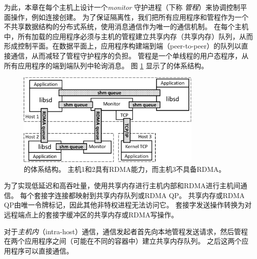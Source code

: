为此，本章在每个主机上设计一个\emph {monitor} 守护进程（下称 \textit{管程}）来协调控制平面操作，例如连接创建。
为了保证隔离性，我们把所有应用程序和管程作为一个不共享数据结构的分布式系统，使用消息通信作为唯一的通信机制。
在每个主机中，所有加载\libipc {}的应用程序必须与主机的管程建立共享内存（共享内存）队列，从而形成控制平面。在数据平面上，应用程序构建端到端（peer-to-peer）的队列以直接通信，从而减轻了管程守护程序的负担。
管程是一个单线程的用户态程序，从所有应用程序的端到端队列中轮询消息。
图 \ref {socksdirect:fig:architecture} 显示了\sys {}的体系结构。


\begin{figure}[htbp]
	\centering
	\includegraphics[width=0.8\textwidth]{images/architecture_new}
	\caption{\sys {}的体系结构。 主机1和2具有RDMA能力，而主机3不具备RDMA。}
	\label{socksdirect:fig:architecture}
\end{figure}



为了实现低延迟和高吞吐量，\sys {}使用共享内存进行主机内部和RDMA进行主机间通信。
每个套接字连接都映射到共享内存队列或RDMA QP。
共享内存或RDMA QP由唯一令牌标记，因此其他非特权进程无法访问它。
套接字发送操作转换为对远程端点上的套接字缓冲区的共享内存或RDMA写操作。

对于\emph {主机内}（intra-host）通信，通信发起者首先向本地管程发送请求，然后管程在两个应用程序之间（可能在不同的容器中）建立共享内存队列。 之后这两个应用程序可以直接通信。



